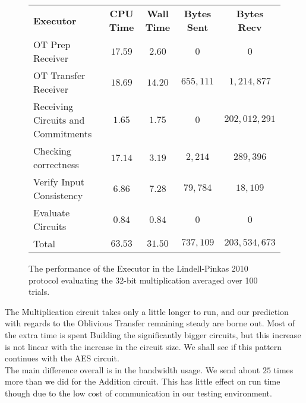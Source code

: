 \documentclass[ %
                    author={Nicholas Tutte},
                supervisor={Prof. Nigel Smart},
                    degree={MEng},
                     title={Secure Two Party Computation},
                  subtitle={A practical comparison of recent protocols},
                      type={Research - GG1K},
                      year={2015} ]{dissertation}
\begin{document}
				\begin{figure}[!ht]
					\begin{tabular}{| p{4.3cm} | c c c c |}
						\hline
						\textbf{Executor} & \textbf{CPU Time} & \textbf{Wall Time} & \textbf{Bytes Sent} & \textbf{Bytes Recv} \\
						\thickhline
						OT Prep Receiver & $17.59$ & $2.60$ & $0$ & $0$ \\
						\hline
						OT Transfer Receiver & $18.69$ & $14.20$ & $655,111$ & $1,214,877$ \\
						\hline
						Receiving Circuits and Commitments & $1.65$ & $1.75$ & $0$ & $202,012,291$ \\
						\hline
						Checking correctness & $17.14$ & $3.19$ & $2,214$ & $289,396$ \\
						\hline
						Verify Input Consistency & $6.86$ & $7.28$ & $79,784$ & $18,109$ \\
						\hline
						Evaluate Circuits & $0.84$ & $0.84$ & $0$ & $0$ \\
						\thickhline
						Total & $63.53$ & $31.50$ & $737,109$ & $203,534,673$ \\
						\hline
					\end{tabular}
					\caption{The performance of the Executor in the Lindell-Pinkas 2010 protocol evaluating the 32-bit multiplication averaged over 100 trials. \label{table:LP_2010_Mul_Executor}}
				\end{figure}
				\FloatBarrier

				The Multiplication circuit takes only a little longer to run, and our prediction with regards to the Oblivious Transfer remaining steady are borne out. Most of the extra time is spent Building the significantly bigger circuits, but this increase is not linear with the increase in the circuit size. We shall see if this pattern continues with the AES circuit.\\

				The main difference overall is in the bandwidth usage. We send about $25$ times more than we did for the Addition circuit. This has little effect on run time though due to the low cost of communication in our testing environment.\\
\end{document}
